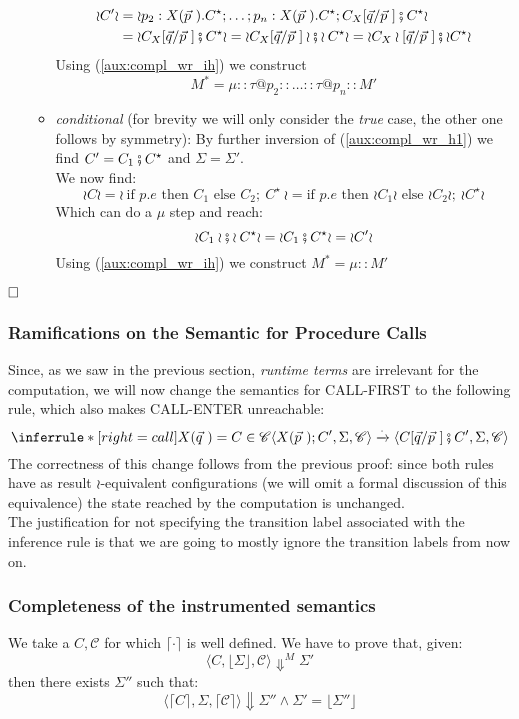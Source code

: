 \documentclass[12pt,a4paper,twoside]{book}
\newcommand{\qed}{\hfill\square}
\begin{document}
\begin{itemize}
\begin{itemize}
				\begin{align*}
					\wr C' \wr &= \wr p_2 : X(\vec{p}~).C^\star; \ldots; p_n : X(\vec{p}~).C^\star; C_X[\vec{q}/\vec{p}~] \fatsemi C^\star \wr \\
					&= \wr C_X[\vec{q}/\vec{p}~] \fatsemi C^\star \wr =
		\wr C_X[\vec{q}/\vec{p}~] \wr \fatsemi \wr C^\star \wr =
				\wr C_X\wr[\vec{q}/\vec{p}~] \fatsemi \wr C^\star \wr
				\end{align*}
				Using (\ref{aux:compl_wr_ih}) we construct
				$$ M^* = \mu :: \tau@p_2 :: \ldots :: \tau@p_n :: M'$$
			\item \emph{conditional} (for brevity we will only consider the \emph{true} case, the other one follows by symmetry):
				By further inversion of (\ref{aux:compl_wr_h1}) we find $C' = C_1 \fatsemi C^\star$ and $\Sigma = \Sigma'$.\\
				We now find:
				$$
				\wr C \wr = \wr~\text{if } p.e \text{ then } C_1 \text{ else } C_2;~C^\star~\wr 
				= \text{if } p.e \text{ then } \wr C_1 \wr \text{ else } \wr C_2\wr;~\wr C^\star \wr 
				$$
				Which can do a $\mu$ step and reach:
				$$ \wr C_1 \wr \fatsemi \wr C^\star \wr = \wr C_1 \fatsemi C^\star \wr = \wr C' \wr$$
				Using (\ref{aux:compl_wr_ih}) we construct $M^* = \mu :: M'$
		\end{itemize}
\end{itemize}
$\qed$

\subsubsection{Ramifications on the Semantic for Procedure Calls}
Since, as we saw in the previous section, \emph{runtime terms} are irrelevant for the computation, we will now change the semantics for CALL-FIRST to the following rule, which also makes CALL-ENTER unreachable:
$$
    \inferrule*[right=call] { X(\vec{q}~) = C \in \mathscr{C}}
	{\langle X(\vec{p}~);C', \Sigma, \mathscr{C} \rangle \xrightarrow{\cdot} \langle C[\vec{q}/\vec{p}~] \fatsemi C', \Sigma, \mathscr{C} \rangle}
$$
The correctness of this change follows from the previous proof: since both rules have as result $\wr$-equivalent configurations (we will omit a formal discussion of this equivalence) the state reached by the computation is unchanged.\\
The justification for not specifying the transition label associated with the inference rule is that we are going to mostly ignore the transition labels from now on.

\subsubsection{Completeness of the instrumented semantics}
We take a  $C, \mathscr{C}$ for which $\lceil \cdot \rceil$ is well defined.
We have to prove that, given:
$$
\langle C, \lfloor \Sigma \rfloor, \mathscr{C}\rangle \Downarrow^M \Sigma'
$$
then there exists $\Sigma''$ such that:
$$
\langle \lceil C \rceil, \Sigma, \lceil \mathscr{C}\rceil\rangle \Downarrow \Sigma''
\land \Sigma' = \lfloor \Sigma'' \rfloor 
$$
\end{document}
